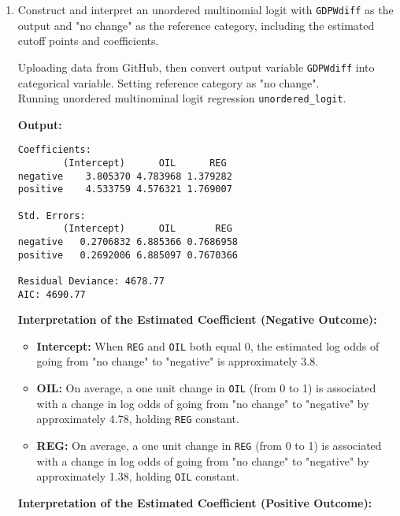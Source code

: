 \documentclass[12pt,letterpaper]{article}
\begin{document}
\begin{enumerate}
	\item Construct and interpret an unordered multinomial logit with \texttt{GDPWdiff} as the output and "no change" as the reference category, including the estimated cutoff points and coefficients.
	
	\vspace{0.5cm}
	\noindent  Uploading data from GitHub, then convert output variable \texttt{GDPWdiff} into categorical variable. Setting reference category as "no change". \\ Running unordered multinominal logit regression \texttt{unordered\_logit}. 
	 
	\noindent \textbf{Output:}
	
		\begin{footnotesize}
		\begin{verbatim}
Coefficients:         
        (Intercept)      OIL      REG
negative    3.805370 4.783968 1.379282
positive    4.533759 4.576321 1.769007

Std. Errors:         
        (Intercept)      OIL       REG
negative   0.2706832 6.885366 0.7686958
positive   0.2692006 6.885097 0.7670366

Residual Deviance: 4678.77 
AIC: 4690.77 
		\end{verbatim}  
	\end{footnotesize}
	
		\vspace{0.5cm}
\textbf{Interpretation of the Estimated Coefficient (Negative Outcome):}

\begin{itemize}
	\item \textbf{Intercept:} When \texttt{REG} and \texttt{OIL} both equal 0, the estimated log odds of going from "no change" to "negative" is approximately 3.8.
	\item \textbf{OIL:} On average, a one unit change in \texttt{OIL} (from 0 to 1) is associated with a change in log odds of going from "no change" to "negative" by approximately 4.78, holding \texttt{REG} constant.
	\item \textbf{REG:} On average, a one unit change in \texttt{REG} (from 0 to 1) is associated with a change in log odds of going from "no change" to "negative" by approximately 1.38, holding \texttt{OIL} constant.
\end{itemize}
	
\textbf{Interpretation of the Estimated Coefficient (Positive Outcome):}


\end{enumerate}
\end{document}
